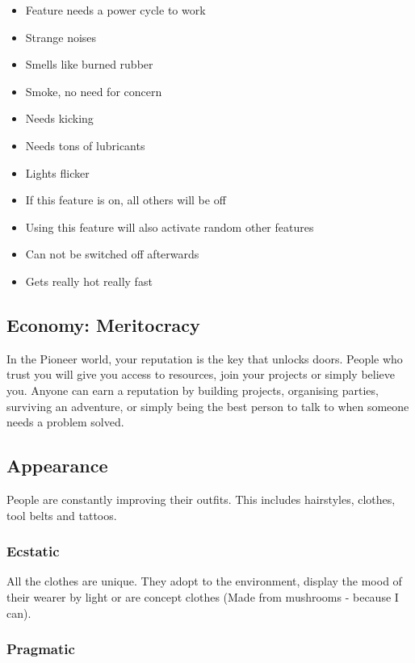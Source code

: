 \begin{itemize}
    \item Feature needs a power cycle to work
    \item Strange noises
    \item Smells like burned rubber
    \item Smoke, no need for concern
    \item Needs kicking
    \item Needs tons of lubricants
    \item Lights flicker
    \item If this feature is on, all others will be off
    \item Using this feature will also activate random other features
    \item Can not be switched off afterwards
    \item Gets really hot really fast
\end{itemize}



\subsection{Economy: Meritocracy}
\label{sec:meritocracy}

In the Pioneer world, your reputation is the key that unlocks doors. People who trust you will give you access to resources, join your projects or simply believe you.
Anyone can earn a reputation by building projects, organising parties, surviving an adventure, or simply being the best person to talk to when someone needs a problem solved.

\subsection{Appearance}

People are constantly improving their outfits. This includes hairstyles, clothes, tool belts and tattoos.

\subsubsection{Ecstatic}

All the clothes are unique. They adopt to the environment, display the mood of their wearer by light or are concept clothes (Made from mushrooms - because I can).

\subsubsection{Pragmatic}

